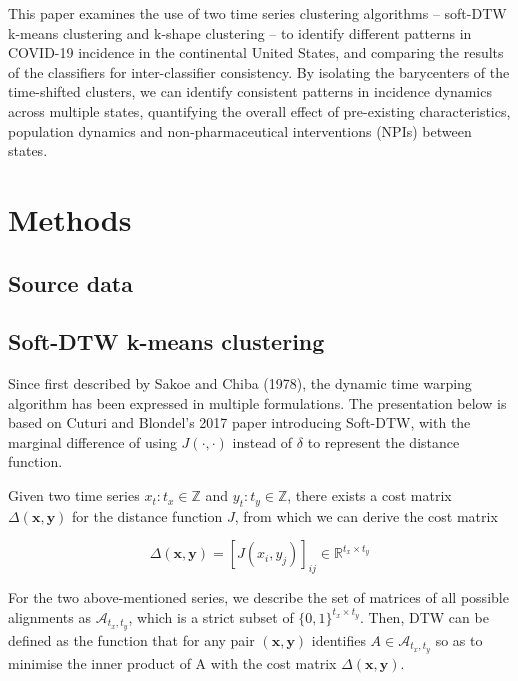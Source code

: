 \documentclass{article}
\begin{document}
This paper examines the use of two time series clustering algorithms -- soft-DTW k-means clustering and k-shape clustering -- to identify different patterns in COVID-19 incidence in the continental United States, and comparing the results of the classifiers for inter-classifier consistency. By isolating the barycenters of the time-shifted clusters, we can identify consistent patterns in incidence dynamics across multiple states, quantifying the overall effect of pre-existing characteristics, population dynamics and non-pharmaceutical interventions (NPIs) between states.


\section{Methods} %
\label{sec:methods}

\subsection{Source data} %
\label{sub:source_data}



\subsection{Soft-DTW k-means clustering} %
\label{sub:soft_dtw_k_means_clustering}

Since first described by Sakoe and Chiba (1978),\cite{sakoe1978dynamic} the dynamic time warping algorithm has been expressed in multiple formulations. The presentation below is based on Cuturi and Blondel's 2017 paper introducing Soft-DTW, with the marginal difference of using $J(\cdot, \cdot)$ instead of $\delta$ to represent the distance function.\cite{cuturi2017soft} 

Given two time series $x_t: t_x \in \mathbb{Z}$ and $y_t: t_y \in \mathbb{Z}$, there exists a cost matrix $\Delta(\mathbf{x}, \mathbf{y})$ for the distance function $J$, from which we can derive the cost matrix 

\begin{equation}
	\Delta(\mathbf{x}, \mathbf{y}) = [J(x_i, y_j)]_{ij} \in \mathbb{R}^{t_x \times t_y} 
\end{equation}

For the two above-mentioned series, we describe the set of matrices of all possible alignments as $\mathcal{A}_{t_x, t_y}$, which is a strict subset of $\{0, 1\}^{t_x \times t_y}$. Then, DTW can be defined as the function that for any pair $(\mathbf{x}, \mathbf{y})$ identifies $A \in \mathcal{A}_{t_x, t_y}$ so as to minimise the inner product of A with the cost matrix $\Delta(\mathbf{x}, \mathbf{y})$.
\end{document}
